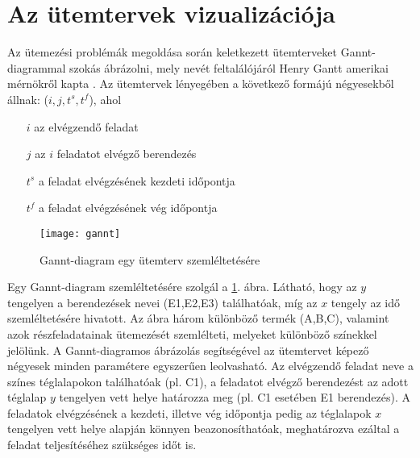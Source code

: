 \section{Az ütemtervek vizualizációja}
Az ütemezési problémák megoldása során keletkezett ütemterveket Gannt-diagrammal szokás ábrázolni, mely nevét feltalálójáról Henry Gantt amerikai mérnökről kapta \cite{0879600489}. 
Az ütemtervek lényegében a következő formájú négyesekből állnak: ($i,j,t^s,t^f$), ahol
\begin{itemize}
\item[$i$] az elvégzendő feladat
\item[$j$] az $i$ feladatot elvégző berendezés
\item[$t^s$] a feladat elvégzésének kezdeti időpontja
\item[$t^f$] a feladat elvégzésének vég időpontja
\end{itemize}
\begin{figure}[H]
\begin{center}
\texttt{[image: gannt]}
\caption{Gannt-diagram egy ütemterv szemléltetésére}
\label{gannt}
\end{center}
\end{figure}
Egy Gannt-diagram szemléltetésére szolgál a \ref{gannt}. ábra.
Látható, hogy az $y$ tengelyen a berendezések nevei (E1,E2,E3) találhatóak, míg az $x$ tengely az idő szemléltetésére hivatott.
Az ábra három különböző termék (A,B,C), valamint azok részfeladatainak ütemezését szemlélteti, melyeket különböző színekkel jelölünk.
A Gannt-diagramos ábrázolás segítségével az ütemtervet képező négyesek minden paramétere egyszerűen leolvasható.
Az elvégzendő feladat neve a színes téglalapokon találhatóak (pl. C1), a feladatot elvégző berendezést az adott téglalap $y$ tengelyen vett helye határozza meg (pl. C1 esetében E1 berendezés).
A feladatok elvégzésének a kezdeti, illetve vég időpontja pedig az téglalapok $x$ tengelyen vett helye alapján könnyen beazonosíthatóak, meghatározva ezáltal a feladat teljesítéséhez szükséges időt is. 